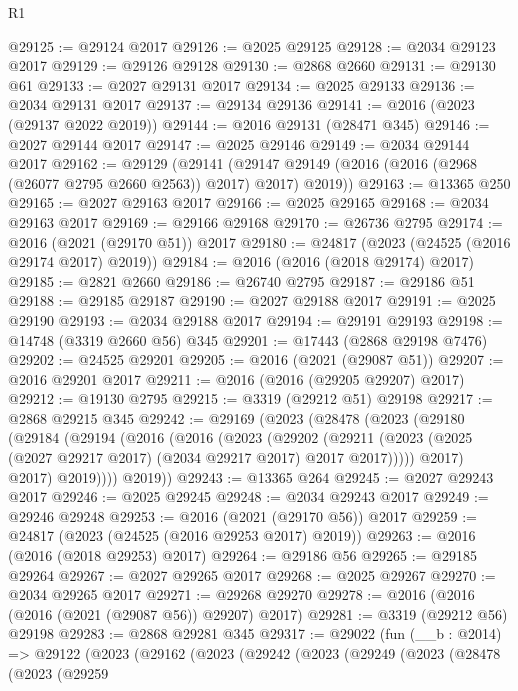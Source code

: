 \begin{lexlean}{R1}
\begin{coremodule}
@29125 := @29124 @2017
@29126 := @2025 @29125
@29128 := @2034 @29123 @2017
@29129 := @29126 @29128
@29130 := @2868 @2660
@29131 := @29130 @61
@29133 := @2027 @29131 @2017
@29134 := @2025 @29133
@29136 := @2034 @29131 @2017
@29137 := @29134 @29136
@29141 := @2016 (@2023 (@29137 @2022 @2019))
@29144 := @2016 @29131 (@28471 @345)
@29146 := @2027 @29144 @2017
@29147 := @2025 @29146
@29149 := @2034 @29144 @2017
@29162 := @29129
    (@29141 (@29147 @29149 (@2016 (@2016 (@2968 (@26077 @2795 @2660 @2563)) @2017) @2017) @2019))
@29163 := @13365 @250
@29165 := @2027 @29163 @2017
@29166 := @2025 @29165
@29168 := @2034 @29163 @2017
@29169 := @29166 @29168
@29170 := @26736 @2795
@29174 := @2016 (@2021 (@29170 @51)) @2017
@29180 := @24817 (@2023 (@24525 (@2016 @29174 @2017) @2019))
@29184 := @2016 (@2016 (@2018 @29174) @2017)
@29185 := @2821 @2660
@29186 := @26740 @2795
@29187 := @29186 @51
@29188 := @29185 @29187
@29190 := @2027 @29188 @2017
@29191 := @2025 @29190
@29193 := @2034 @29188 @2017
@29194 := @29191 @29193
@29198 := @14748 (@3319 @2660 @56) @345
@29201 := @17443 (@2868 @29198 @7476)
@29202 := @24525 @29201
@29205 := @2016 (@2021 (@29087 @51))
@29207 := @2016 @29201 @2017
@29211 := @2016 (@2016 (@29205 @29207) @2017)
@29212 := @19130 @2795
@29215 := @3319 (@29212 @51) @29198
@29217 := @2868 @29215 @345
@29242 := @29169
    (@2023
      (@28478
        (@2023
          (@29180
            (@29184
              (@29194
                (@2016
                  (@2016
                    (@2023
                      (@29202
                        (@29211
                          (@2023 (@2025 (@2027 @29217 @2017) (@2034 @29217 @2017) @2017 @2017)))))
                    @2017)
                  @2017)
                @2019))))
        @2019))
@29243 := @13365 @264
@29245 := @2027 @29243 @2017
@29246 := @2025 @29245
@29248 := @2034 @29243 @2017
@29249 := @29246 @29248
@29253 := @2016 (@2021 (@29170 @56)) @2017
@29259 := @24817 (@2023 (@24525 (@2016 @29253 @2017) @2019))
@29263 := @2016 (@2016 (@2018 @29253) @2017)
@29264 := @29186 @56
@29265 := @29185 @29264
@29267 := @2027 @29265 @2017
@29268 := @2025 @29267
@29270 := @2034 @29265 @2017
@29271 := @29268 @29270
@29278 := @2016 (@2016 (@2016 (@2021 (@29087 @56)) @29207) @2017)
@29281 := @3319 (@29212 @56) @29198
@29283 := @2868 @29281 @345
@29317 := @29022
    (fun (__b : @2014) =>
    @29122
      (@2023
        (@29162
          (@2023
            (@29242
              (@2023
                (@29249
                  (@2023
                    (@28478
                      (@2023
                        (@29259

\end{coremodule}
\end{lexlean}
